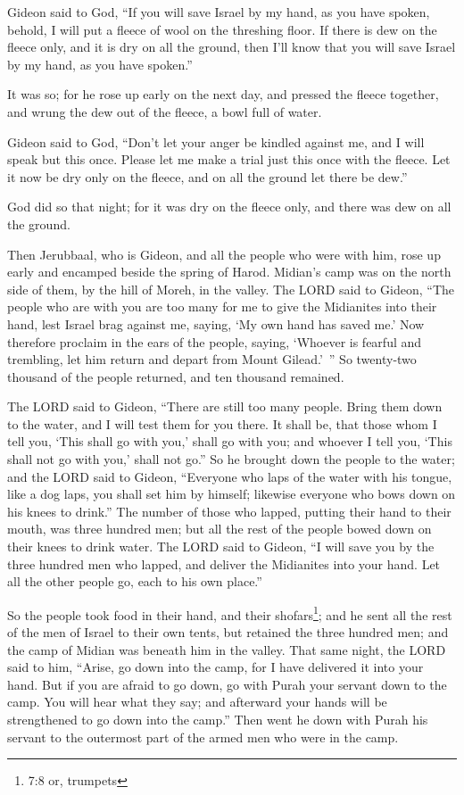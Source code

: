 \myverse{}Gideon said to God, “If you will save Israel by my hand, as you
have spoken,
\myverse{}behold, I will put a fleece of wool on the threshing floor. If there is dew
on the fleece only, and it is dry on all the ground, then I’ll know that you will save Israel by my hand,
as you have spoken.”

\myverse{}It was so; for he rose up early on the next day, and pressed
the fleece together, and wrung the dew out of the fleece, a bowl full of water.

\myverse{}Gideon said to God, “Don’t let your anger be kindled against
me, and I will speak but this once. Please let me make a trial just this once with the fleece. Let it
now be dry only on the fleece, and on all the ground let there be dew.”

\myverse{}God did so that night; for it was dry on the fleece only, and
there was dew on all the ground.


\mychapter{} \myverse*{}Then Jerubbaal, who is Gideon, and all the people who were with
him, rose up early and encamped beside the spring of Harod. Midian’s camp was on the north side of them,
by the hill of Moreh, in the valley.
\myverse{}The LORD said to Gideon, “The people who are with you are too many for me to
give the Midianites into their hand, lest Israel brag against me, saying, ‘My own hand has saved me.’
\myverse{}Now therefore proclaim in the ears of the people, saying, ‘Whoever is fearful
and trembling, let him return and depart from Mount Gilead.’ ” So twenty-two thousand of the people returned,
and ten thousand remained.

\myverse{}The LORD said to Gideon, “There are still too many people. Bring
them down to the water, and I will test them for you there. It shall be, that those whom I tell you, ‘This
shall go with you,’ shall go with you; and whoever I tell you, ‘This shall not go with you,’ shall not
go.”
\myverse{}So he brought down the people to the water; and the LORD said to Gideon, “Everyone
who laps of the water with his tongue, like a dog laps, you shall set him by himself; likewise everyone
who bows down on his knees to drink.”
\myverse{}The number of those who lapped, putting their hand to their mouth, was three
hundred men; but all the rest of the people bowed down on their knees to drink water.
\myverse{}The LORD said to Gideon, “I will save you by the three hundred men who lapped,
and deliver the Midianites into your hand. Let all the other people go, each to his own place.”

\myverse{}So the people took food in their hand, and their shofars\footnote{7:8 or, trumpets};
and he sent all the rest of the men of Israel to their own tents, but retained the three hundred men;
and the camp of Midian was beneath him in the valley.
\myverse{}That same night, the LORD said to him, “Arise, go down into the camp, for I
have delivered it into your hand.
\myverse{}But if you are afraid to go down, go with Purah your servant down to the camp.
\myverse{}You will hear what they say; and afterward your hands will be strengthened
to go down into the camp.” Then went he down with Purah his servant to the outermost part of the armed
men who were in the camp.

